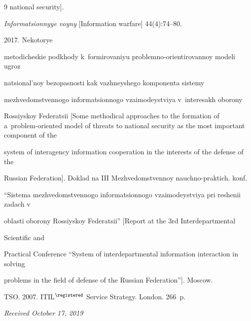 {{\begin{thebibliography}{9}
national security]. 


\textit{Informatsionnyye voyny} [Information warfare] 44(4):74--80.




 2017. Nekotorye 


me\-to\-di\-che\-skie podkhody k~formirovaniyu problemno-orientirovannoy modeli ugroz 


natsional'noy bez\-opas\-nosti kak vazhneyshego komponenta sistemy 


mezhvedomstvennogo in\-for\-ma\-tsi\-on\-no\-go vzaimodeystviya v~interesakh oborony 


Rossiyskoy Federatsii [Some methodical approaches to the formation of a~problem-oriented model of threats to national security as the most important component of the 


system of interagency information cooperation in the interests of the defense of the 


Russian Federation]. Doklad na III Mezhvedomstvennoy nauchno-praktich. konf. 


``Sistema mezhvedomstvennogo informatsionnogo vzaimodeystviya pri reshenii zadach v 


oblasti oborony Rossiyskoy Federatsii'' [Report at the 3rd Interdepartmental 


Scientific and 


Practical Conference ``System of interdepartmental information interaction in solving 


problems in the field of defense of the Russian Federation'']. Moscow.




TSO. 2007. ITIL$^\registered$ Service Strategy. London. 266~p.


\end{thebibliography}


} }













\hfill{\small\textit{Received October 17, 2019}} 








